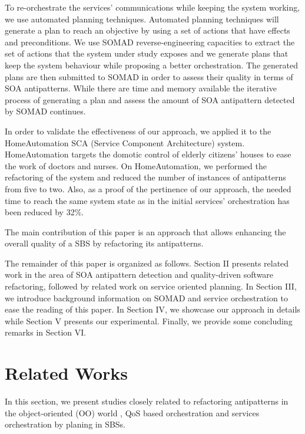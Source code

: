 \documentclass[lnbip]{svmultln}
\begin{document}
To re-orchestrate the services’ communications while keeping the system working, we use automated planning techniques. Automated planning techniques will generate a plan to reach an objective by using a set of actions that have effects and preconditions. We use SOMAD reverse-engineering capacities to extract the set of actions that the system under study  exposes and we generate plans that keep the system behaviour while proposing a better orchestration. The generated plans are then submitted to SOMAD in order to assess their quality in terms of SOA antipatterns.  While there are time and memory available the iterative process of generating a plan and assess the amount of SOA antipattern detected by SOMAD continues. 

 In order to validate the effectiveness of our approach, we applied it to the HomeAutomation SCA (Service Component Architecture) system. HomeAutomation targets the domotic control of elderly citizens' houses to ease the work of  doctors and nurses. On HomeAutomation, we performed the refactoring of the system and reduced the number of instances of antipatterns from five  to two. Also, as a proof of the pertinence of our approach, the needed time to reach the same system state as in the initial services' orchestration has been reduced by 32\%.
 
The main contribution of this paper is an approach that allows enhancing the overall quality of a SBS by refactoring its antipatterns. 

The remainder of this paper is organized as follows. Section II presents related work in the area of SOA antipattern detection and quality-driven software refactoring, followed by related work on service oriented planning. In Section III, we introduce background information on SOMAD and service orchestration to ease the reading of this paper. In Section IV, we showcase our approach in details while Section V presents our experimental. Finally, we provide some concluding remarks in Section VI.


\section{Related Works}

In this section, we present studies closely related to refactoring antipatterns in the object-oriented (OO) world , QoS based orchestration and services orchestration by planing in SBSs. 
\end{document}
